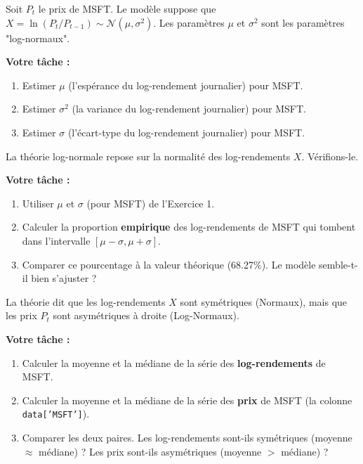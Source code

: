 \begin{exercicebox}
Soit $P_t$ le prix de MSFT. Le modèle suppose que $X = \ln(P_t/P_{t-1}) \sim \mathcal{N}(\mu, \sigma^2)$. Les paramètres $\mu$ et $\sigma^2$ sont les paramètres "log-normaux".

\textbf{Votre tâche :}
\begin{enumerate}
    \item Estimer $\mu$ (l'espérance du log-rendement journalier) pour MSFT.
    \item Estimer $\sigma^2$ (la variance du log-rendement journalier) pour MSFT.
    \item Estimer $\sigma$ (l'écart-type du log-rendement journalier) pour MSFT.
\end{enumerate}
\end{exercicebox}

\begin{exercicebox}
La théorie log-normale repose sur la normalité des log-rendements $X$. Vérifions-le.

\textbf{Votre tâche :}
\begin{enumerate}
    \item Utiliser $\mu$ et $\sigma$ (pour MSFT) de l'Exercice 1.
    \item Calculer la proportion \textbf{empirique} des log-rendements de MSFT qui tombent dans l'intervalle $[\mu - \sigma, \mu + \sigma]$.
    \item Comparer ce pourcentage à la valeur théorique (68.27\%). Le modèle semble-t-il bien s'ajuster ?
\end{enumerate}
\end{exercicebox}

\begin{exercicebox}
La théorie dit que les log-rendements $X$ sont symétriques (Normaux), mais que les prix $P_t$ sont asymétriques à droite (Log-Normaux).

\textbf{Votre tâche :}
\begin{enumerate}
    \item Calculer la moyenne et la médiane de la série des \textbf{log-rendements} de MSFT.
    \item Calculer la moyenne et la médiane de la série des \textbf{prix} de MSFT (la colonne \texttt{data['MSFT']}).
    \item Comparer les deux paires. Les log-rendements sont-ils symétriques (moyenne $\approx$ médiane) ? Les prix sont-ils asymétriques (moyenne $>$ médiane) ?
\end{enumerate}
\end{exercicebox}

